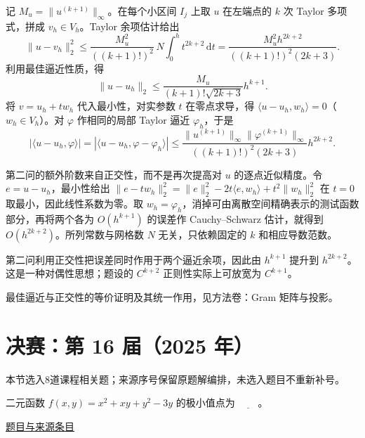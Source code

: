 \documentclass[UTF8,12pt,a4paper,fontset=fandol]{ctexart}
\begin{document}
\begin{solve}\label{ans:fin15-high:13}

记 $M_u=\|u^{(k+1)}\|_\infty$。在每个小区间 $I_j$ 上取 $u$ 在左端点的 $k$ 次 Taylor 多项式，拼成 $v_h\in V_h$。Taylor 余项估计给出
\[
\|u-v_h\|_2^2
\le\frac{M_u^2}{((k+1)!)^2}\,N\int_0^ht^{2k+2}\,\mathrm dt
=\frac{M_u^2h^{2k+2}}{((k+1)!)^2(2k+3)}.
\]
利用最佳逼近性质，得
\[
\|u-u_h\|_2\le\frac{M_u}{(k+1)!\sqrt{2k+3}}h^{k+1}.
\]
将 $v=u_h+tw_h$ 代入最小性，对实参数 $t$ 在零点求导，得 $\langle u-u_h,w_h\rangle=0$（$w_h\in V_h$）。对 $\varphi$ 作相同的局部 Taylor 逼近 $\varphi_h$，于是
\[
|\langle u-u_h,\varphi\rangle|
=|\langle u-u_h,\varphi-\varphi_h\rangle|
\le\frac{\|u^{(k+1)}\|_\infty\|\varphi^{(k+1)}\|_\infty}
{((k+1)!)^2(2k+3)}h^{2k+2}.
\]

第二问的额外阶数来自正交性，而不是再次提高对 $u$ 的逐点近似精度。令 $e=u-u_h$，最小性给出 $\|e-tw_h\|_2^2=\|e\|_2^2-2t\langle e,w_h\rangle+t^2\|w_h\|_2^2$ 在 $t=0$ 取最小，因此线性系数为零。取 $w_h=\varphi_h$，消掉可由离散空间精确表示的测试函数部分，再将两个各为 $O(h^{k+1})$ 的误差作 Cauchy--Schwarz 估计，就得到 $O(h^{2k+2})$。所列常数与网格数 $N$ 无关，只依赖固定的 $k$ 和相应导数范数。

\end{solve}

\begin{remark}[方法与条件]第二问利用正交性把误差同时作用于两个逼近余项，因此由 $h^{k+1}$ 提升到 $h^{2k+2}$。这是一种对偶性思想；题设的 $C^{k+2}$ 正则性实际上可放宽为 $C^{k+1}$。

最佳逼近与正交性的等价证明及其统一作用，见方法卷：Gram 矩阵与投影。\end{remark}

\section{决赛：第 16 届（2025 年）}

本节选入8道课程相关题；来源序号保留原题解编排，未选入题目不重新补号。

\begin{example}[来源序号2]\label{ex:fin16-high:2}\label{pr:fin16-high:2}

二元函数 $f(x,y) = x^2 + xy + y^2 - 3y$ 的极小值点为 $\underline{\qquad}$。

\par\href{https://github.com/lzxcr/cmc-mathematics/blob/64916fa1fdbc3e444a652eca204d5669058ee321/src/problems/finals/16/02.md}{题目与来源条目}

\end{example}
\end{document}
